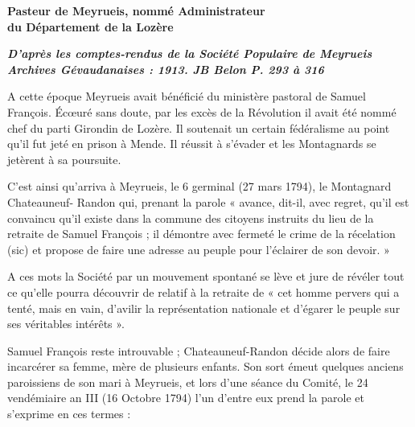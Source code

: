 

\begin{center}

\vspace{0.45em}

{\large\bfseries Pasteur de Meyrueis, nommé Administrateur\\
du Département de la Lozère}

\vspace{0.45em}

{\small\bfseries\itshape
D’après les comptes-rendus de la Société Populaire de Meyrueis\\
Archives Gévaudanaises : 1913. JB Belon P. 293 à 316}
\end{center}

\vspace{0.7em}

A cette époque Meyrueis avait bénéficié du ministère pastoral de Samuel François.
Écœuré sans doute, par les excès de la Révolution il avait été nommé chef du parti Girondin de
Lozère. Il soutenait un certain fédéralisme au point qu’il fut jeté en prison à Mende. Il réussit
à s’évader et les Montagnards se jetèrent à sa poursuite.

C’est ainsi qu’arriva à Meyrueis, le 6 germinal (27 mars 1794), le Montagnard Chateauneuf-
Randon qui, prenant la parole « avance, dit-il, avec regret, qu’il est convaincu qu’il existe
dans la commune des citoyens instruits du lieu de la retraite de Samuel François ; il démontre
avec fermeté le crime de la récelation (sic) et propose de faire une adresse au peuple pour
l’éclairer de son devoir. »

A ces mots la Société par un mouvement spontané se lève et jure de révéler tout ce qu’elle
pourra découvrir de relatif à la retraite de « cet homme pervers qui a tenté, mais en vain,
d’avilir la représentation nationale et d’égarer le peuple sur ses véritables intérêts ».

Samuel François reste introuvable ; Chateauneuf-Randon décide alors de faire incarcérer sa
femme, mère de plusieurs enfants. Son sort émeut quelques anciens paroissiens de son mari à
Meyrueis, et lors d’une séance du Comité, le 24 vendémiaire an III (16 Octobre 1794) l’un
d’entre eux prend la parole et s’exprime en ces termes :

